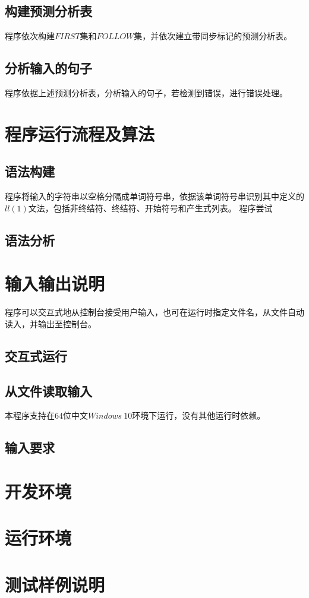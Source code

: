 \documentclass[UTF8]{ctexart}
\begin{document}
\subsection{构建预测分析表}
程序依次构建$FIRST$集和$FOLLOW$集，并依次建立带同步标记的预测分析表。
\subsection{分析输入的句子}
程序依据上述预测分析表，分析输入的句子，若检测到错误，进行错误处理。
\section{程序运行流程及算法}
\subsection{语法构建}
程序将输入的字符串以空格分隔成单词符号串，依据该单词符号串识别其中定义的$ll(1)$文法，包括非终结符、终结符、开始符号和产生式列表。
程序尝试
\subsection{语法分析}

\section{输入输出说明}
程序可以交互式地从控制台接受用户输入，也可在运行时指定文件名，从文件自动读入，并输出至控制台。
\subsection{交互式运行}
\subsection{从文件读取输入}
本程序支持在$64$位中文$Windows \ 10$环境下运行，没有其他运行时依赖。
\subsection{输入要求}
\section{开发环境}
\section{运行环境}
\section{测试样例说明}
\end{document}
